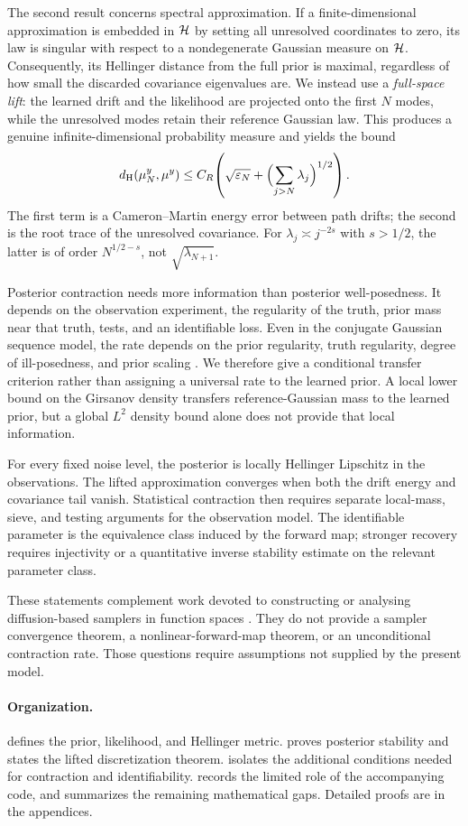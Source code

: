 The second result concerns spectral approximation.  If a
finite-dimensional approximation is embedded in $\mathcal{H}$ by setting all
unresolved coordinates to zero, its law is singular with respect to a
nondegenerate Gaussian measure on $\mathcal{H}$.  Consequently, its Hellinger
distance from the full prior is maximal, regardless of how small the
discarded covariance eigenvalues are.  We instead use a
\emph{full-space lift}: the learned drift and the likelihood are
projected onto the first $N$ modes, while the unresolved modes retain
their reference Gaussian law.  This produces a genuine
infinite-dimensional probability measure and yields the bound
\[
  {d_{\mathrm{H}}}({\mu^{y}_{N}},{\mu^{y}})
  \leq C_R\!\left(\sqrt{\varepsilon_N}
                  +\Bigl(\sum_{j>N}\lambda_j\Bigr)^{1/2}\right).
\]
The first term is a Cameron--Martin energy error between path drifts;
the second is the root trace of the unresolved covariance.  For
$\lambda_j\asymp j^{-2s}$ with $s>1/2$, the latter is of order
$N^{1/2-s}$, not $\sqrt{\lambda_{N+1}}$.

Posterior contraction needs more information than posterior
well-posedness.  It depends on the observation experiment, the
regularity of the truth, prior mass near that truth, tests, and an
identifiable loss.  Even in the conjugate Gaussian sequence model, the
rate depends on the prior regularity, truth regularity, degree of
ill-posedness, and prior scaling \citep{knapik2011}.  We therefore give
a conditional transfer criterion rather than assigning a universal
rate to the learned prior.  A local lower bound on the Girsanov density
transfers reference-Gaussian mass to the learned prior, but a global
$L^2$ density bound alone does not provide that local information.

For every fixed noise level, the posterior is locally Hellinger
Lipschitz in the observations.  The lifted approximation converges when
both the drift energy and covariance tail vanish.  Statistical
contraction then requires separate local-mass, sieve, and testing
arguments for the observation model.  The identifiable parameter is
the equivalence class induced by the forward map; stronger recovery
requires injectivity or a quantitative inverse stability estimate on
the relevant parameter class.

These statements complement work devoted to constructing or analysing
diffusion-based samplers in function spaces
\citep{baldassari2025langevin,baker2026,cheng2026}.  They do not provide
a sampler convergence theorem, a nonlinear-forward-map theorem, or an
unconditional contraction rate.  Those questions require assumptions
not supplied by the present model.

\paragraph{Organization.}
 defines the prior, likelihood, and Hellinger metric.
 proves posterior stability and states the lifted
discretization theorem.   isolates the additional
conditions needed for contraction and identifiability.
 records the limited role of the accompanying
code, and  summarizes the remaining mathematical
gaps.  Detailed proofs are in the appendices.
